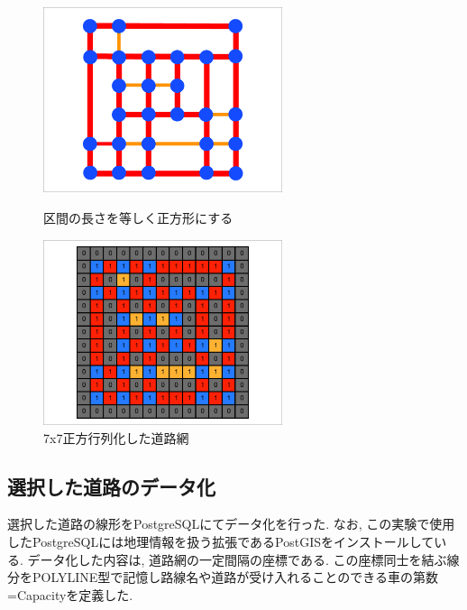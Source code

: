 \begin{figure}[htbp]
    \begin{minipage}{0.5\hsize}
        \begin{center}
            \includegraphics[width=70mm]{assets/MAP_5.eps}
        \end{center}
        \caption{区間の長さを等しく正方形にする}
        \label{fig:one}
    \end{minipage}
    \begin{minipage}{0.5\hsize}
        \begin{center}
            \includegraphics[width=70mm]{assets/MAP_6.eps}
        \end{center}
        \caption{7x7正方行列化した道路網}
        \label{fig:two}
    \end{minipage}
\end{figure}




\subsection{選択した道路のデータ化}

選択した道路の線形をPostgreSQLにてデータ化を行った. なお, この実験で使用したPostgreSQLには地理情報を扱う拡張であるPostGISをインストールしている.
データ化した内容は, 道路網の一定間隔の座標である. この座標同士を結ぶ線分をPOLYLINE型で記憶し路線名や道路が受け入れることのできる車の第数=Capacityを定義した.

